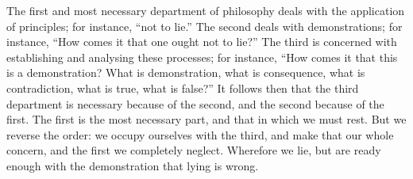 The  first  and  most  necessary   department  of  philosophy  deals  with  the
application of principles; for instance, ``not  to lie.'' The second deals with
demonstrations; for instance,  ``How comes it that one ought  not to lie?'' The
third  is  concerned  with  establishing and  analysing  these  processes;  for
instance, ``How comes  it that this is a demonstration?  What is demonstration,
what is consequence,  what is contradiction, what is true,  what is false?'' It
follows then that the third department  is necessary because of the second, and
the second because of the first. The first is the most necessary part, and that
in which we must  rest. But we reverse the order: we  occupy ourselves with the
third, and  make that our whole  concern, and the first  we completely neglect.
Wherefore we  lie, but are  ready enough with  the demonstration that  lying is
wrong.
